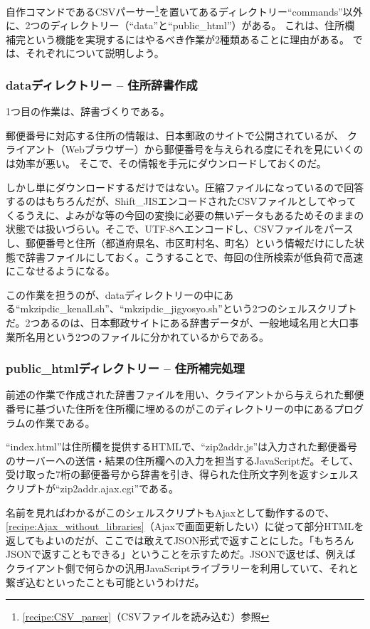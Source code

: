 自作コマンドであるCSVパーサー\footnote{\ref{recipe:CSV_parser}（CSVファイルを読み込む）参照}を置いてあるディレクトリー``commands''以外に、2つのディレクトリー（``data''と``public\_{}html''）がある。
これは、住所欄補完という機能を実現するにはやるべき作業が2種類あることに理由がある。
では、それぞれについて説明しよう。

\subsubsection*{dataディレクトリー -- 住所辞書作成}

1つ目の作業は、辞書づくりである。

郵便番号に対応する住所の情報は、日本郵政のサイトで公開されているが、
クライアント（Webブラウザー）から郵便番号を与えられる度にそれを見にいくのは効率が悪い。
そこで、その情報を手元にダウンロードしておくのだ。

しかし単にダウンロードするだけではない。圧縮ファイルになっているので回答するのはもちろんだが、Shift\_{}JISエンコードされたCSVファイルとしてやってくるうえに、よみがな等の今回の変換に必要の無いデータもあるためそのままの状態では扱いづらい。そこで、UTF-8へエンコードし、CSVファイルをパースし、郵便番号と住所（都道府県名、市区町村名、町名）という情報だけにした状態で辞書ファイルにしておく。こうすることで、毎回の住所検索が低負荷で高速にこなせるようになる。

この作業を担うのが、dataディレクトリーの中にある``mkzipdic\_{}kenall.sh''、``mkzipdic\_{}jigyosyo.sh''という2つのシェルスクリプトだ。2つあるのは、日本郵政サイトにある辞書データが、一般地域名用と大口事業所名用という2つのファイルに分かれているからである。

\subsubsection*{public\_{}htmlディレクトリー -- 住所補完処理}

前述の作業で作成された辞書ファイルを用い、クライアントから与えられた郵便番号に基づいた住所を住所欄に埋めるのがこのディレクトリーの中にあるプログラムの作業である。

``index.html''は住所欄を提供するHTMLで、``zip2addr.js''は入力された郵便番号のサーバーへの送信・結果の住所欄への入力を担当するJavaScriptだ。そして、受け取った7桁の郵便番号から辞書を引き、得られた住所文字列を返すシェルスクリプトが``zip2addr.ajax.cgi''である。

名前を見ればわかるがこのシェルスクリプトもAjaxとして動作するので、\ref{recipe:Ajax_without_libraries}（Ajaxで画面更新したい）に従って部分HTMLを返してもよいのだが、ここでは敢えてJSON形式で返すことにした。「もちろんJSONで返すこともできる」ということを示すためだ。JSONで返せば、例えばクライアント側で何らかの汎用JavaScriptライブラリーを利用していて、それと繋ぎ込むといったことも可能というわけだ。

